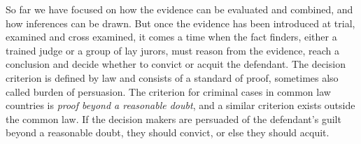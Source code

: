 \documentclass[10pt]{article}
\begin{document}
So far we have focused on how the evidence can be evaluated and combined, and how inferences can be drawn. 
But once the evidence has been introduced at trial, examined and cross examined, it comes a time when the fact finders, either a 
trained judge or a group of lay jurors, must reason from the evidence, reach a conclusion and decide 
whether to convict or acquit the defendant. 
%
The decision criterion is defined by law 
and consists of a standard of proof, sometimes also called burden of persuasion. 
The criterion for criminal cases in common law countries is 
\textit{proof beyond a reasonable doubt}, and a similar criterion exists outside the common law.
 If the decision makers are persuaded of the defendant's guilt beyond a reasonable doubt, 
 they should convict, or else they should acquit.  
\end{document}
